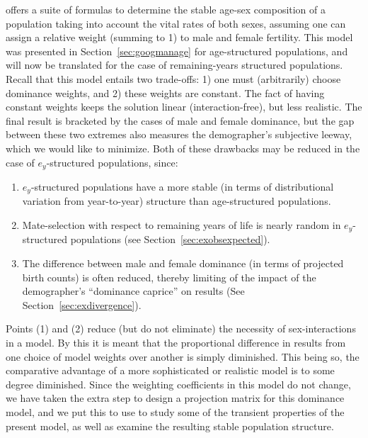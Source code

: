  \FloatBarrier
 
\citet{goodman1967age} offers a suite of
formulas to determine the stable age-sex composition of a population taking into
account the vital rates of both sexes, assuming one can assign a relative weight
(summing to 1) to male and female fertility. This model was presented in
Section~\ref{sec:googmanage} for age-structured populations, and will now be
translated for the case of remaining-years structured populations. Recall that
this model entails two trade-offs: 1) one must (arbitrarily) choose dominance
weights, and 2) these weights are constant. The fact of having constant weights 
keeps the solution linear (interaction-free), but less realistic. The final result is bracketed by the
cases of male and female dominance, but the gap between these two extremes 
also measures the demographer's subjective leeway, which we would like to
minimize. Both of these drawbacks may be reduced in the case of $e_y$-structured
populations, since: 
\begin{enumerate}
  \item $e_y$-structured populations have a more stable (in terms of
  distributional variation from year-to-year) structure than age-structured
  populations.
  \item Mate-selection with respect to remaining years of
life is nearly random in $e_y$-structured populations (see
Section~\ref{sec:exobsexpected}).
  \item The difference between male and female dominance (in terms of projected
birth counts) is often reduced, thereby limiting of the impact of the
demographer's ``dominance caprice'' on results (See
Section~\ref{sec:exdivergence}).
\end{enumerate}
Points (1) and (2) reduce (but do
not eliminate) the necessity of sex-interactions in a model. By this it is meant
that the proportional difference in results from one choice of model weights
over another is simply diminished. This being so, the comparative advantage of a
more sophisticated or realistic model is to some degree diminished. Since the
weighting coefficients in this model do not change, we have taken the extra step
to design a projection matrix for this dominance model, and we put this to use
to study some of the transient properties of the present model, as well as
examine the resulting stable population structure.
